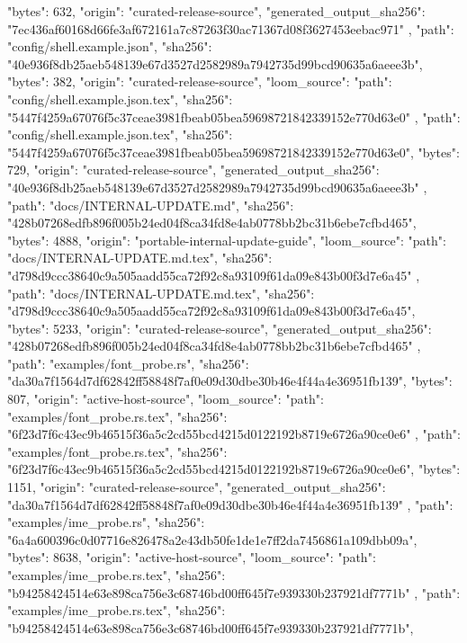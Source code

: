 {{      "bytes": 632,
      "origin": "curated-release-source",
      "generated_output_sha256": "7ec436af60168d66fe3af672161a7c87263f30ac71367d08f3627453eebac971"
    },
    {
      "path": "config/shell.example.json",
      "sha256": "40e936f8db25aeb548139e67d3527d2582989a7942735d99bcd90635a6aeee3b",
      "bytes": 382,
      "origin": "curated-release-source",
      "loom_source": {
        "path": "config/shell.example.json.tex",
        "sha256": "5447f4259a67076f5c37ceae3981fbeab05bea59698721842339152e770d63e0"
      }
    },
    {
      "path": "config/shell.example.json.tex",
      "sha256": "5447f4259a67076f5c37ceae3981fbeab05bea59698721842339152e770d63e0",
      "bytes": 729,
      "origin": "curated-release-source",
      "generated_output_sha256": "40e936f8db25aeb548139e67d3527d2582989a7942735d99bcd90635a6aeee3b"
    },
    {
      "path": "docs/INTERNAL-UPDATE.md",
      "sha256": "428b07268edfb896f005b24ed04f8ca34fd8e4ab0778bb2bc31b6ebe7cfbd465",
      "bytes": 4888,
      "origin": "portable-internal-update-guide",
      "loom_source": {
        "path": "docs/INTERNAL-UPDATE.md.tex",
        "sha256": "d798d9ccc38640c9a505aadd55ca72f92c8a93109f61da09e843b00f3d7e6a45"
      }
    },
    {
      "path": "docs/INTERNAL-UPDATE.md.tex",
      "sha256": "d798d9ccc38640c9a505aadd55ca72f92c8a93109f61da09e843b00f3d7e6a45",
      "bytes": 5233,
      "origin": "curated-release-source",
      "generated_output_sha256": "428b07268edfb896f005b24ed04f8ca34fd8e4ab0778bb2bc31b6ebe7cfbd465"
    },
    {
      "path": "examples/font_probe.rs",
      "sha256": "da30a7f1564d7df62842ff58848f7af0e09d30dbe30b46e4f44a4e36951fb139",
      "bytes": 807,
      "origin": "active-host-source",
      "loom_source": {
        "path": "examples/font_probe.rs.tex",
        "sha256": "6f23d7f6c43ec9b46515f36a5c2cd55bcd4215d0122192b8719e6726a90ce0e6"
      }
    },
    {
      "path": "examples/font_probe.rs.tex",
      "sha256": "6f23d7f6c43ec9b46515f36a5c2cd55bcd4215d0122192b8719e6726a90ce0e6",
      "bytes": 1151,
      "origin": "curated-release-source",
      "generated_output_sha256": "da30a7f1564d7df62842ff58848f7af0e09d30dbe30b46e4f44a4e36951fb139"
    },
    {
      "path": "examples/ime_probe.rs",
      "sha256": "6a4a600396c0d07716e826478a2e43db50fe1de1e7ff2da7456861a109dbb09a",
      "bytes": 8638,
      "origin": "active-host-source",
      "loom_source": {
        "path": "examples/ime_probe.rs.tex",
        "sha256": "b94258424514e63e898ca756e3c68746bd00ff645f7e939330b237921df7771b"
      }
    },
    {
      "path": "examples/ime_probe.rs.tex",
      "sha256": "b94258424514e63e898ca756e3c68746bd00ff645f7e939330b237921df7771b",
}}
